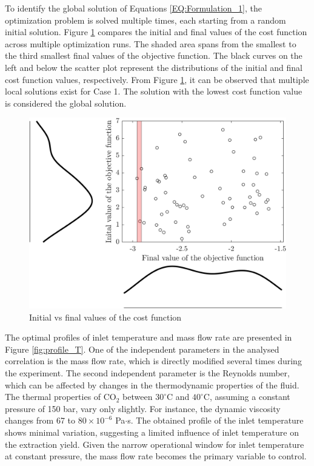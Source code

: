 \documentclass[../Article_Sensitivity_Analsysis.tex]{subfiles}
\begin{document}
	
	\label{CH: Results}
	
	To identify the global solution of Equations \ref{EQ:Formulation_1}, the optimization problem is solved multiple times, each starting from a random initial solution. Figure \ref{fig:scatter_T} compares the initial and final values of the cost function across multiple optimization runs. The shaded area spans from the smallest to the third smallest final values of the objective function. The black curves on the left and below the scatter plot represent the distributions of the initial and final cost function values, respectively. From Figure \ref{fig:scatter_T}, it can be observed that multiple local solutions exist for Case 1. The solution with the lowest cost function value is considered the global solution.
	
	\begin{figure}[h!]
		\centering
		\includegraphics[width=\columnwidth]{Figures/Results/scatter_T.png}	
		\caption{Initial vs final values of the cost function}
		\label{fig:scatter_T}
	\end{figure}
	
	The optimal profiles of inlet temperature and mass flow rate are presented in Figure \ref{fig:profile_T}. One of the independent parameters in the analysed correlation is the mass flow rate, which is directly modified several times during the experiment. The second independent parameter is the Reynolds number, which can be affected by changes in the thermodynamic properties of the fluid. The thermal properties of CO$_2$ between $30^\circ$C and $40^\circ$C, assuming a constant pressure of 150 bar, vary only slightly. For instance, the dynamic viscosity changes from 67 to $80 \times 10^{-6}$ Pa$\cdot$s. The obtained profile of the inlet temperature shows minimal variation, suggesting a limited influence of inlet temperature on the extraction yield. Given the narrow operational window for inlet temperature at constant pressure, the mass flow rate becomes the primary variable to control.
	
\end{document}
